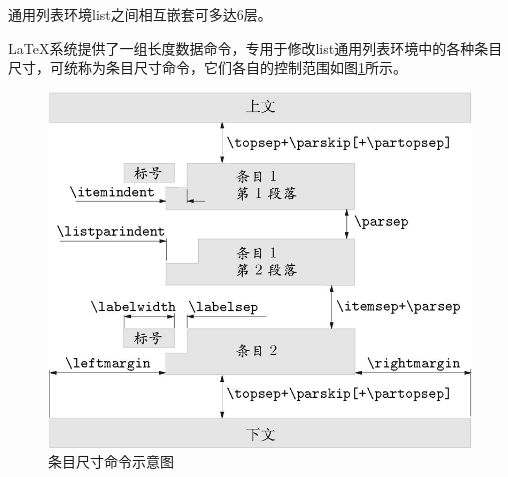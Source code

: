 % 



通用列表环境list之间相互嵌套可多达6层。

\LaTeX 系统提供了一组长度数据命令，专用于修改list通用列表环境中的各种条目尺寸，可统称为条目尺寸命令，它们各自的控制范围如图\ref{fig:条目尺寸命令示意图}所示。

\begin{figure}[htbp]
\centering
\includegraphics[width=0.5\linewidth]{我的学习笔记_XeLaTeX/列表/通用列表环境_list.png}
\caption{条目尺寸命令示意图}\label{fig:条目尺寸命令示意图}
\end{figure}%





